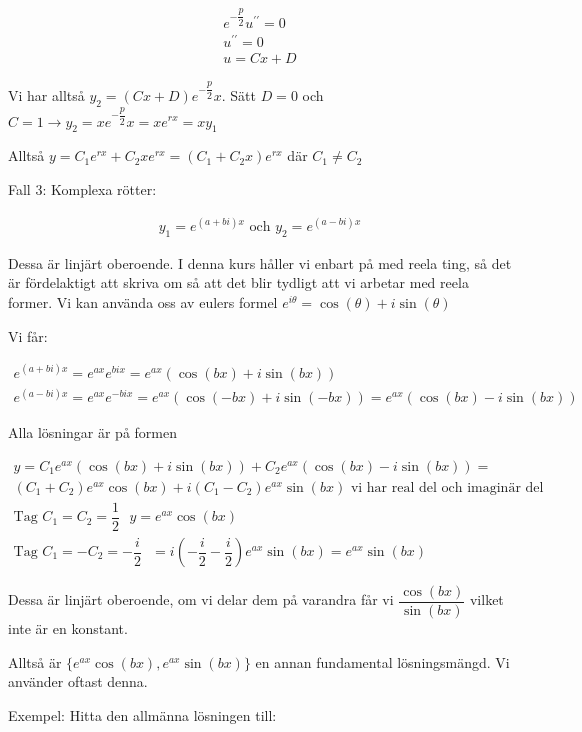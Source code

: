 \begin{equation*}
  \begin{gathered}
    e^{-\dfrac{p}{2}}u^{\prime\prime}=0\\
    u^{\prime\prime}=0\\
    u=Cx+D
  \end{gathered}
\end{equation*}

\noindent Vi har alltså $y_2=(Cx+D)e^{-\dfrac{p}{2}}x$. Sätt $D=0$ och $C=1\rightarrow y_2=xe^{-\dfrac{p}{2}}x=xe^{rx}=xy_1$
\par\bigskip


\noindent Alltså $y=C_1e^{rx}+C_2xe^{rx} = (C_1+C_2x)e^{rx}$ där $C_1\neq C_2$
\par\bigskip
\noindent Fall 3: Komplexa rötter:


\begin{equation*}
  \begin{gathered}
    y_1=e^{(a+bi)x}\text{ och } y_2=e^{(a-bi)x}
  \end{gathered}
\end{equation*}
\par\bigskip
\noindent Dessa är linjärt oberoende. I denna kurs håller vi enbart på med reela ting, så det är fördelaktigt att skriva om så att det blir tydligt att vi arbetar med reela former. Vi kan använda oss av eulers formel $e^{i\theta}=\cos(\theta)+i\sin(\theta)$
\par\bigskip
\noindent Vi får:


\begin{equation*}
  \begin{gathered}
    e^{(a+bi)x}=e^{ax}e^{bix}=e^{ax}(\cos(bx)+i\sin(bx))\\
    e^{(a-bi)x}=e^{ax}e^{-bix}=e^{ax}(\cos(-bx)+i\sin(-bx))=e^{ax}(\cos(bx)-i\sin(bx))
  \end{gathered}
\end{equation*}
\par\bigskip
\noindent Alla lösningar är på formen


\begin{equation*}
  \begin{gathered}
    y=C_1e^{ax}(\cos(bx)+i\sin(bx))+C_2e^{ax}(\cos(bx)-i\sin(bx))=\\
    (C_1+C_2)e^{ax}\cos(bx)+i(C_1-C_2)e^{ax}\sin(bx) \text{ vi har real del och imaginär del}\\
    \text{Tag $C_1=C_2=\dfrac{1}{2}$ } y= e^{ax}\cos(bx)\\
    \text{Tag $C_1=-C_2 = -\dfrac{i}{2}$ } = i(-\dfrac{i}{2}-\dfrac{i}{2})e^{ax}\sin(bx)=e^{ax}\sin(bx)
  \end{gathered}
\end{equation*}
\par\bigskip
\noindent Dessa är linjärt oberoende, om vi delar dem på varandra får vi $\dfrac{\cos(bx)}{\sin(bx)}$ vilket inte är en konstant.
\par\bigskip
\noindent Alltså är $\{e^{ax}\cos(bx), e^{ax}\sin(bx)\}$ en annan fundamental lösningsmängd. Vi använder oftast denna.
\par\bigskip
\noindent Exempel: Hitta den allmänna lösningen till:

